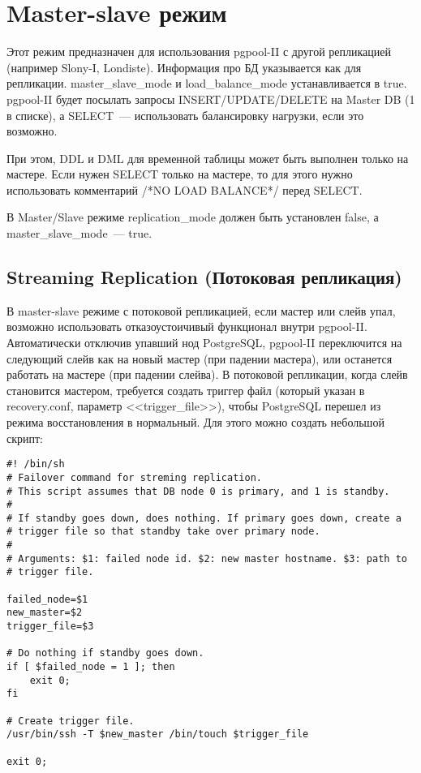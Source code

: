 \section{Master-slave режим}
Этот режим предназначен для использования pgpool-II с другой репликацией (например Slony-I, Londiste). 
Информация про БД указывается как для репликации. master\_slave\_mode и load\_balance\_mode устанавливается в true. 
pgpool-II будет посылать запросы INSERT/UPDATE/DELETE на Master DB (1 в списке), а SELECT~--- использовать балансировку 
нагрузки, если это возможно.

При этом, DDL и DML для временной таблицы может быть выполнен только на мастере. Если нужен SELECT только на мастере, то для этого 
нужно использовать комментарий /*NO LOAD BALANCE*/ перед SELECT.

В Master/Slave режиме replication\_mode должен быть установлен false, а master\_slave\_mode~--- true.

\subsection{Streaming Replication (Потоковая репликация)}
В master-slave режиме с потоковой репликацией, если мастер или слейв упал, возможно использовать 
отказоустоичивый функционал внутри pgpool-II. Автоматически отключив упавший нод PostgreSQL, pgpool-II переключится на следующий 
слейв как на новый мастер (при падении мастера), или останется работать на мастере (при падении слейва). 
В потоковой репликации, когда слейв становится мастером, требуется создать триггер файл 
(который указан в recovery.conf, параметр <<trigger\_file>>), чтобы PostgreSQL перешел из режима 
восстановления в нормальный. Для этого можно создать небольшой скрипт:
\begin{lstlisting}[label=lst:pgpool40,caption=Скрипт выполняется при падении нода PostgreSQL]
#! /bin/sh
# Failover command for streming replication.
# This script assumes that DB node 0 is primary, and 1 is standby.
# 
# If standby goes down, does nothing. If primary goes down, create a
# trigger file so that standby take over primary node.
#
# Arguments: $1: failed node id. $2: new master hostname. $3: path to
# trigger file.

failed_node=$1
new_master=$2
trigger_file=$3

# Do nothing if standby goes down.
if [ $failed_node = 1 ]; then
	exit 0;
fi

# Create trigger file.
/usr/bin/ssh -T $new_master /bin/touch $trigger_file

exit 0;
\end{lstlisting}

